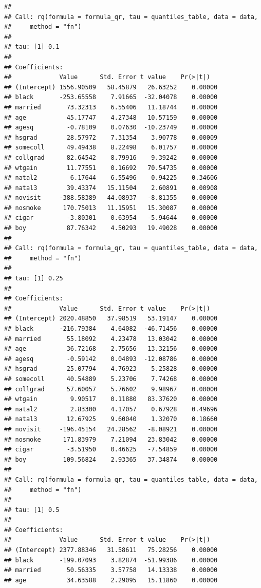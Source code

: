\documentclass[]{book}
\begin{document}
\begin{verbatim}
##
## Call: rq(formula = formula_qr, tau = quantiles_table, data = data,
##     method = "fn")
##
## tau: [1] 0.1
##
## Coefficients:
##             Value      Std. Error t value    Pr(>|t|)
## (Intercept) 1556.90509   58.45879   26.63252    0.00000
## black       -253.65558    7.91665  -32.04078    0.00000
## married       73.32313    6.55406   11.18744    0.00000
## age           45.17747    4.27348   10.57159    0.00000
## agesq         -0.78109    0.07630  -10.23749    0.00000
## hsgrad        28.57972    7.31354    3.90778    0.00009
## somecoll      49.49438    8.22498    6.01757    0.00000
## collgrad      82.64542    8.79916    9.39242    0.00000
## wtgain        11.77551    0.16692   70.54735    0.00000
## natal2         6.17644    6.55496    0.94225    0.34606
## natal3        39.43374   15.11504    2.60891    0.00908
## novisit     -388.58389   44.08937   -8.81355    0.00000
## nosmoke      170.75013   11.15951   15.30087    0.00000
## cigar         -3.80301    0.63954   -5.94644    0.00000
## boy           87.76342    4.50293   19.49028    0.00000
##
## Call: rq(formula = formula_qr, tau = quantiles_table, data = data,
##     method = "fn")
##
## tau: [1] 0.25
##
## Coefficients:
##             Value      Std. Error t value    Pr(>|t|)
## (Intercept) 2020.48850   37.98519   53.19147    0.00000
## black       -216.79384    4.64082  -46.71456    0.00000
## married       55.18092    4.23478   13.03042    0.00000
## age           36.72168    2.75656   13.32156    0.00000
## agesq         -0.59142    0.04893  -12.08786    0.00000
## hsgrad        25.07794    4.76923    5.25828    0.00000
## somecoll      40.54889    5.23706    7.74268    0.00000
## collgrad      57.60057    5.76602    9.98967    0.00000
## wtgain         9.90517    0.11880   83.37620    0.00000
## natal2         2.83300    4.17057    0.67928    0.49696
## natal3        12.67925    9.60040    1.32070    0.18660
## novisit     -196.45154   24.28562   -8.08921    0.00000
## nosmoke      171.83979    7.21094   23.83042    0.00000
## cigar         -3.51950    0.46625   -7.54859    0.00000
## boy          109.56824    2.93365   37.34874    0.00000
##
## Call: rq(formula = formula_qr, tau = quantiles_table, data = data,
##     method = "fn")
##
## tau: [1] 0.5
##
## Coefficients:
##             Value      Std. Error t value    Pr(>|t|)
## (Intercept) 2377.88346   31.58611   75.28256    0.00000
## black       -199.07093    3.82874  -51.99386    0.00000
## married       50.56335    3.57758   14.13338    0.00000
## age           34.63588    2.29095   15.11860    0.00000

\end{verbatim}
\end{document}
